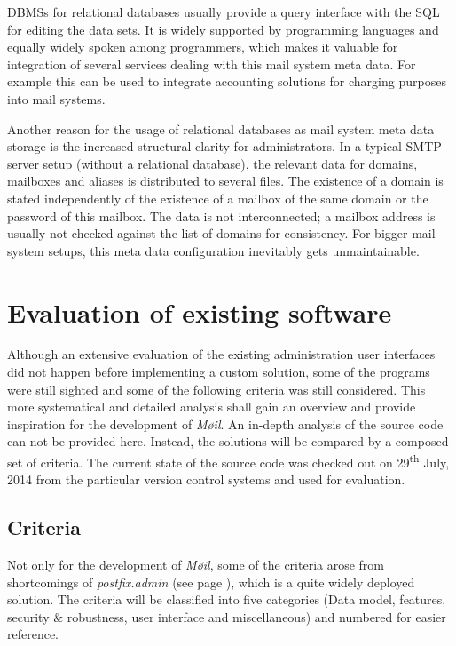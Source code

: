 \documentclass[12pt,a4paper]{scrartcl}
\begin{document}

		\acp{DBMS} for relational databases usually provide a query interface
		with the \ac{SQL} \cite{sql} for editing the data sets. It is widely
		supported by programming languages and equally widely spoken among
		programmers, which makes it valuable for integration of several
		services dealing with this mail system meta data. For example this can
		be used to integrate accounting solutions for charging purposes into
		mail systems.


		Another reason for the usage of relational databases as mail system
		meta data storage is the increased structural clarity for
		administrators. In a typical \acs{SMTP} \cite{smtp} server setup
		(without a relational database), the relevant data for domains,
		mailboxes and aliases is distributed to several files. The existence of
		a domain is stated independently of the existence of a mailbox of the
		same domain or the password of this mailbox. The data is not
		interconnected; a mailbox address is usually not checked against the
		list of domains for consistency. For bigger mail system setups, this
		meta data configuration inevitably gets unmaintainable.

	\section*{Evaluation of existing software}

		Although an extensive evaluation of the existing administration user
		interfaces did not happen before implementing a custom solution, some
		of the programs were still sighted and some of the following criteria
		was still considered. This more systematical and detailed analysis
		shall gain an overview and provide inspiration for the development of
		\emph{Møil}. An in-depth analysis of the source code can not be
		provided here. Instead, the solutions will be compared by a composed set
		of criteria. The current state of the source code was checked out on
		29\textsuperscript{th} July, 2014 from the particular version control
		systems and used for evaluation.

		\subsection*{Criteria}
			\label{sec:evaluation:criteria}
			Not only for the development of \emph{Møil}, some of the criteria
			arose from shortcomings of \emph{postfix.admin} (see page
			\pageref{sec:contestants:postfix.admin}), which is a quite widely
			deployed solution. The criteria will be classified into five
			categories (Data model, features, security \& robustness, user
			interface and miscellaneous) and numbered for easier reference.
\end{document}
